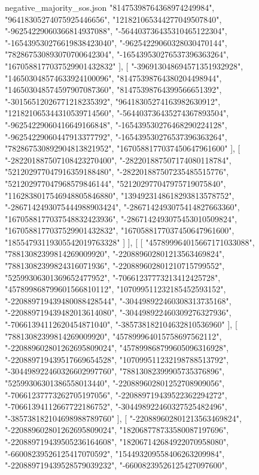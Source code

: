 \begin{filecontents*}[overwrite]{negative_majority_sos.json}
    "81475398764368974249984",
    "96418305274075925446656",
    "121821065344277049507840",
    "-96254229060366814937088",
    "-564403736435310465122304",
    "-165439530276619838423040",
    "-96254229060328030470144",
    "782867530893070700642304",
    "-165439530276537396363264",
    "1670588177037529901432832"
   ],
   [
    "-396913048694571351932928",
    "146503048574633924100096",
    "81475398764380204498944",
    "146503048574597907087360",
    "81475398764399566651392",
    "-30156512026771218235392",
    "96418305274163982630912",
    "121821065344310539714560",
    "-564403736435274367893504",
    "-96254229060416649166848",
    "-165439530276468290224128",
    "-96254229060447913377792",
    "-165439530276537396363264",
    "782867530892904813821952",
    "1670588177037450647961600"
   ],
   [
    "-282201887507108423270400",
    "-282201887507174080118784",
    "521202977047916359188480",
    "-282201887507235485515776",
    "521202977047968579846144",
    "521202977047975719075840",
    "1162838017546948805846880",
    "1394923148618293813578752",
    "-2867142493075444988903424",
    "-2867142493075414827663360",
    "1670588177037548832423936",
    "-2867142493075453010509824",
    "1670588177037529901432832",
    "1670588177037450647961600",
    "18554793119305542019763328"
   ]
  ],
  [
   [
    "457899964015667171033088",
    "78813082399814269009920",
    "-220889602801213563469824",
    "78813082399824316071936",
    "-220889602801210715799552",
    "52599306301369652477952",
    "-70661237773213412425728",
    "457899868799601566810112",
    "107099511232185452593152",
    "-220889719439480088428544",
    "-304498922460308313735168",
    "-220889719439482013614080",
    "-304498922460309276327936",
    "-70661394112620454871040",
    "-385738182104632810536960"
   ],
   [
    "78813082399814269009920",
    "457899964015758697562112",
    "-220889602801262695809024",
    "457899868799605096316928",
    "-220889719439517669654528",
    "107099511232198788513792",
    "-304498922460326602997760",
    "78813082399905735376896",
    "52599306301386558013440",
    "-220889602801252708909056",
    "-70661237773262705197056",
    "-220889719439522362294272",
    "-70661394112667722186752",
    "-304498922460327525482496",
    "-385738182104698988789760"
   ],
   [
    "-220889602801213563469824",
    "-220889602801262695809024",
    "182068778733580087197696",
    "-220889719439505236164608",
    "182067142684922070958080",
    "-66008239526125417070592",
    "154493209558406263209984",
    "-220889719439528579039232",
    "-66008239526125427097600",

\end{filecontents*}
